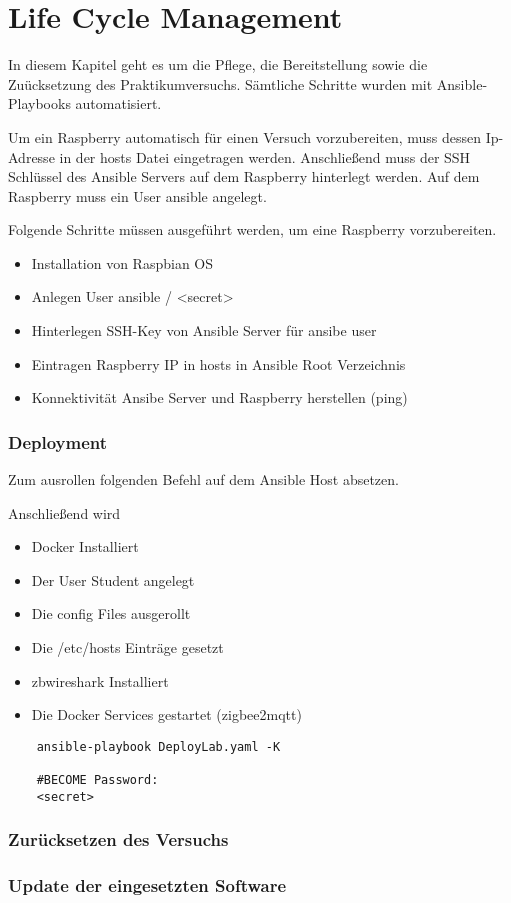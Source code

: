 \chapter{Life Cycle Management}

In diesem Kapitel geht es um die Pflege, die Bereitstellung sowie die Zuücksetzung des Praktikumversuchs. Sämtliche Schritte wurden mit Ansible-Playbooks
automatisiert.

Um ein Raspberry automatisch für einen Versuch vorzubereiten, muss dessen Ip-Adresse in der \grqq hosts \grqq{} Datei eingetragen werden. Anschließend muss der 
SSH Schlüssel des Ansible Servers auf dem Raspberry hinterlegt werden. Auf dem Raspberry muss ein User \grqq ansible \grqq{} angelegt.

Folgende Schritte müssen ausgeführt werden, um eine Raspberry vorzubereiten.
\begin{itemize}
    \item Installation von Raspbian OS
    \item Anlegen User ansible / <secret>
    \item Hinterlegen SSH-Key von Ansible Server für ansibe user
    \item Eintragen Raspberry IP in hosts in Ansible Root Verzeichnis
    \item Konnektivität Ansibe Server und Raspberry herstellen (ping)
\end{itemize}

\subsection{Deployment}

Zum ausrollen folgenden Befehl auf dem Ansible Host absetzen.

Anschließend wird
\begin{itemize}
    \item Docker Installiert
    \item Der User Student angelegt
    \item Die config Files ausgerollt
    \item Die /etc/hosts Einträge gesetzt
    \item zbwireshark Installiert
    \item Die Docker Services gestartet (zigbee2mqtt)
\end{itemize}

\begin{lstlisting}
    ansible-playbook DeployLab.yaml -K
    
    #BECOME Password:
    <secret>
\end{lstlisting}

\subsection{Zurücksetzen des Versuchs}

\subsection{Update der eingesetzten Software}





